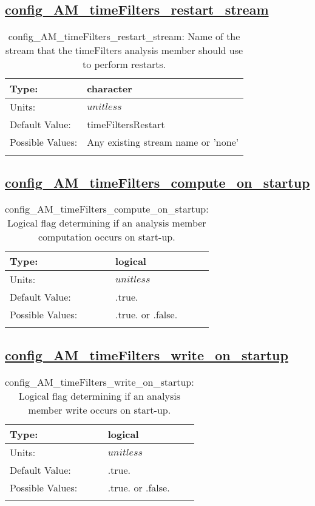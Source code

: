 \subsection[config\_AM\_timeFilters\_restart\_stream]{\hyperref[sec:nm_tab_AM_timeFilters]{config\_AM\_timeFilters\_restart\_stream}}
\label{subsec:nm_sec_config_AM_timeFilters_restart_stream}
\begin{center}
\begin{longtable}{| p{2.0in} || p{4.0in} |}
    \hline
    Type: & character \\
    \hline
    Units: & $unitless$ \\
    \hline
    Default Value: & timeFiltersRestart \\
    \hline
    Possible Values: & Any existing stream name or 'none' \\
    \hline
    \caption{config\_AM\_timeFilters\_restart\_stream: Name of the stream that the timeFilters analysis member should use to perform restarts.}
\end{longtable}
\end{center}
\subsection[config\_AM\_timeFilters\_compute\_on\_startup]{\hyperref[sec:nm_tab_AM_timeFilters]{config\_AM\_timeFilters\_compute\_on\_startup}}
\label{subsec:nm_sec_config_AM_timeFilters_compute_on_startup}
\begin{center}
\begin{longtable}{| p{2.0in} || p{4.0in} |}
    \hline
    Type: & logical \\
    \hline
    Units: & $unitless$ \\
    \hline
    Default Value: & .true. \\
    \hline
    Possible Values: & .true. or .false. \\
    \hline
    \caption{config\_AM\_timeFilters\_compute\_on\_startup: Logical flag determining if an analysis member computation occurs on start-up.}
\end{longtable}
\end{center}
\subsection[config\_AM\_timeFilters\_write\_on\_startup]{\hyperref[sec:nm_tab_AM_timeFilters]{config\_AM\_timeFilters\_write\_on\_startup}}
\label{subsec:nm_sec_config_AM_timeFilters_write_on_startup}
\begin{center}
\begin{longtable}{| p{2.0in} || p{4.0in} |}
    \hline
    Type: & logical \\
    \hline
    Units: & $unitless$ \\
    \hline
    Default Value: & .true. \\
    \hline
    Possible Values: & .true. or .false. \\
    \hline
    \caption{config\_AM\_timeFilters\_write\_on\_startup: Logical flag determining if an analysis member write occurs on start-up.}
\end{longtable}
\end{center}
